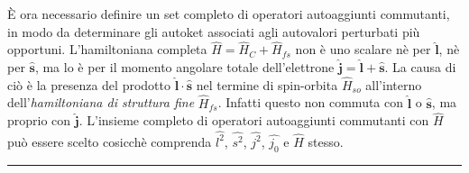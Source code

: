 \documentclass[12pt,a4paper]{report}
\numberwithin{equation}{section}
\numberwithin{section}{chapter}
\begin{document}
	\`E ora necessario definire un set completo di operatori autoaggiunti commutanti, in modo da determinare gli autoket associati agli autovalori perturbati pi\`u opportuni.	L'hamiltoniana completa $\widehat{H} = \widehat{H}_C + \widehat{H}_{fs}$ non \`e uno scalare n\`e per $\widehat{\boldsymbol{l}}$, n\`e per $\widehat{\boldsymbol{s}}$, ma lo \`e per il momento angolare totale dell'elettrone $\widehat{\boldsymbol{j}} = \widehat{\boldsymbol{l}} + \widehat{\boldsymbol{s}}$. La causa di ci\`o \`e la presenza del prodotto $\widehat{\boldsymbol{l}}\cdot\widehat{\boldsymbol{s}}$ nel termine di spin-orbita $\widehat{H}_{so}$ all'interno dell'\textit{hamiltoniana di struttura fine} $\widehat{H}_{fs}$. Infatti questo non commuta con $\widehat{\boldsymbol{l}}$ o $\widehat{\boldsymbol{s}}$, ma proprio con $\widehat{\boldsymbol{j}}$. L'insieme completo di operatori autoaggiunti commutanti con $\widehat{H}$ pu\`o essere scelto cosicch\`e comprenda $\widehat{l^2}$, $\widehat{s^2}$, $\widehat{j^2}$, $\widehat{j_0}$ e $\widehat{H}$ stesso.
	\newpage
	\noindent\rule[0.1cm]{15.8cm}{0.1mm}
\end{document}
